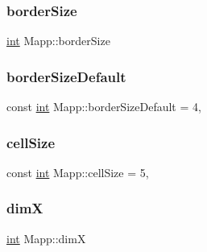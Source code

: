 \mbox{\label{class_mapp_a396e22007b8acd6231f9bd91d263f84f}} 
\subsubsection{\texorpdfstring{borderSize}{borderSize}}
{\footnotesize\ttfamily \mbox{\hyperlink{draw_8hh_aa620a13339ac3a1177c86edc549fda9b}{int}} Mapp\+::border\+Size\hspace{0.3cm}{\ttfamily [protected]}}

\mbox{\label{class_mapp_aef8bde83114714a4ce4ad9d13766e761}} 
\subsubsection{\texorpdfstring{borderSizeDefault}{borderSizeDefault}}
{\footnotesize\ttfamily const \mbox{\hyperlink{draw_8hh_aa620a13339ac3a1177c86edc549fda9b}{int}} Mapp\+::border\+Size\+Default = 4\hspace{0.3cm}{\ttfamily [static]}, {\ttfamily [protected]}}

\mbox{\label{class_mapp_a8216044ff8e95ba054985e26ae1c75f8}} 
\subsubsection{\texorpdfstring{cellSize}{cellSize}}
{\footnotesize\ttfamily const \mbox{\hyperlink{draw_8hh_aa620a13339ac3a1177c86edc549fda9b}{int}} Mapp\+::cell\+Size = 5\hspace{0.3cm}{\ttfamily [static]}, {\ttfamily [protected]}}

\mbox{\label{class_mapp_aeb3ba1ee2b2ac64b01a459b85610f524}} 
\subsubsection{\texorpdfstring{dimX}{dimX}}
{\footnotesize\ttfamily \mbox{\hyperlink{draw_8hh_aa620a13339ac3a1177c86edc549fda9b}{int}} Mapp\+::dimX\hspace{0.3cm}{\ttfamily [protected]}}

